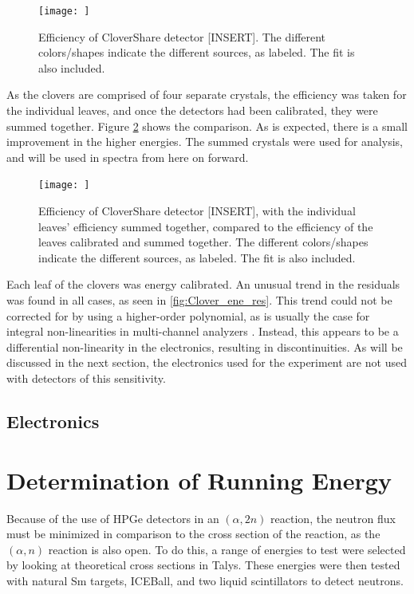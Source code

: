 \begin{figure}
    \centering
    \texttt{[image: ]}
    \caption{Efficiency of CloverShare detector [INSERT]. The different colors/shapes indicate the different sources, as labeled. The fit is also included.}
    \label{fig:Clover_eff}
\end{figure}

As the clovers are comprised of four separate crystals, the efficiency was taken for the individual leaves, and once the detectors had been calibrated, they were summed together. Figure \ref{fig:Clover_ind_vs_sum} shows the comparison. As is expected, there is a small improvement in the higher energies. The summed crystals were used for analysis, and will be used in spectra from here on forward.

\begin{figure}
    \centering
    \texttt{[image: ]}
    \caption{Efficiency of CloverShare detector [INSERT], with the individual leaves' efficiency summed together, compared to the efficiency of the leaves calibrated and summed together. The different colors/shapes indicate the different sources, as labeled. The fit is also included.}
    \label{fig:Clover_ind_vs_sum}
\end{figure}


Each leaf of the clovers was energy calibrated. An unusual trend in the residuals was found in all cases, as seen in \ref{fig:Clover_ene_res}. This trend could not be corrected for by using a higher-order polynomial, as is usually the case for integral non-linearities in multi-channel analyzers \citep{knoll00:rad_det_meas}. Instead, this appears to be a differential non-linearity in the electronics, resulting in discontinuities. As will be discussed in the next section, the electronics used for the experiment are not used with detectors of this sensitivity.

\subsection{Electronics}


\section{Determination of Running Energy}

Because of the use of HPGe detectors in an $(\alpha,2n)$ reaction, the neutron flux must be minimized in comparison to the cross section of the reaction, as the $(\alpha,n)$ reaction is also open. To do this, a range of energies to test were selected by looking at theoretical cross sections in Talys. These energies were then tested with natural Sm targets, ICEBall, and two liquid scintillators to detect neutrons.

